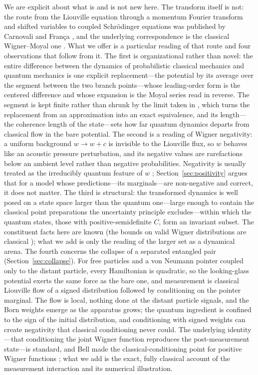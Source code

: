 \documentclass[12pt]{article}
\begin{document}
We are explicit about what is and is not new here.
The transform itself is not: the route from the Liouville equation through a momentum Fourier transform and shifted variables to coupled Schr\"odinger equations was published by Carnovali and Fran\c{c}a \cite{carnovali2005}, and the underlying correspondence is the classical Wigner--Moyal one \cite{case2008,hillery1984}.
What we offer is a particular reading of that route and four observations that follow from it.
The first is organizational rather than novel: the entire difference between the dynamics of probabilistic classical mechanics and quantum mechanics is one explicit replacement---the potential by its average over the segment between the two branch points---whose leading-order form is the centered difference and whose expansion is the Moyal series read in reverse.
The segment is kept finite rather than shrunk by the limit taken in \cite{carnovali2005}, which turns the replacement from an approximation into an exact equivalence, and its length---the coherence length of the state---sets how far quantum dynamics departs from classical flow in the bare potential.
The second is a reading of Wigner negativity: a uniform background $w \rightarrow w + c$ is invisible to the Liouville flux, so $w$ behaves like an acoustic pressure perturbation, and its negative values are rarefactions below an ambient level rather than negative probabilities.
Negativity is usually treated as the irreducibly quantum feature of $w$ \cite{kenfack2004}; Section~\ref{sec:positivity} argues that for a model whose predictions---its marginals---are non-negative and correct, it does not matter.
The third is structural: the transformed dynamics is well posed on a state space larger than the quantum one---large enough to contain the classical point preparations the uncertainty principle excludes---within which the quantum states, those with positive-semidefinite $C$, form an invariant subset.
The constituent facts here are known (the bounds on valid Wigner distributions are classical \cite{narcowich1986}); what we add is only the reading of the larger set as a dynamical arena.
The fourth concerns the collapse of a separated entangled pair (Section~\ref{sec:collapse}).
For free particles and a von Neumann pointer coupled only to the distant particle, every Hamiltonian is quadratic, so the looking-glass potential exerts the same force as the bare one, and measurement is classical Liouville flow of a signed distribution followed by conditioning on the pointer marginal.
The flow is local, nothing done at the distant particle signals, and the Born weights emerge as the apparatus grows; the quantum ingredient is confined to the sign of the initial distribution, and conditioning with signed weights can create negativity that classical conditioning never could.
The underlying identity---that conditioning the joint Wigner function reproduces the post-measurement state---is standard, and Bell made the classical-conditioning point for positive Wigner functions \cite{bell1987}; what we add is the exact, fully classical account of the measurement interaction and its numerical illustration.
\end{document}
